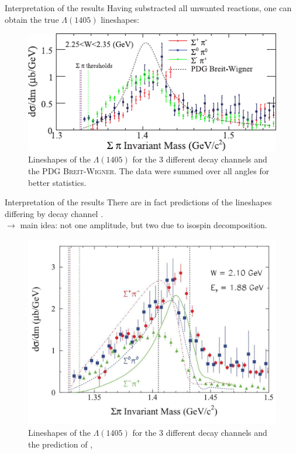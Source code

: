 \documentclass[11pt,aspectratio=1610,dvipsnames]{beamer}
\begin{document}
\begin{frame}{Interpretation of the results}
	Having substracted all unwanted reactions, one can obtain the true $\Lambda(1405)$ lineshapes:
	\begin{figure}
		\centering
		\includegraphics[width=\linewidth,angle=0]{CLAS_lineshape_compare}
		\caption*{Lineshapes of the $\Lambda(1405)$ for the 3 different decay channels and the PDG \textsc{Breit-Wigner}. The data were summed over all angles for better statistics. \citet{lineshapes}}
	\end{figure}
\end{frame}
\begin{frame}{Interpretation of the results}
 There are in fact predictions of the lineshapes differing by decay channel \citet{nacher}. \\$\to$ main idea: not one amplitude, but two due to isospin decomposition.
	\begin{figure}
		\centering
		\includegraphics[width=.58\linewidth]{nacher}
		\caption*{Lineshapes of the $\Lambda(1405)$ for the 3 different decay channels and the prediction of \citet{nacher},  \citet{lineshapes}}
	\end{figure}
\end{frame}
\end{document}
